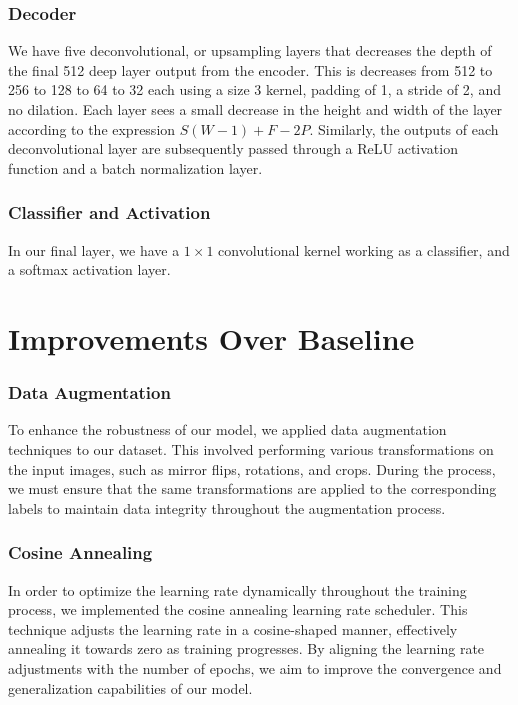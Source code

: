 \subsubsection*{Decoder}
We have five deconvolutional, or upsampling layers that decreases the depth of the final 512 deep layer output from the encoder. This is decreases from 512 to 256 to 128 to 64 to 32 each using a size 3 kernel, padding of 1, a stride of 2, and no dilation. Each layer sees a small decrease in the height and width of the layer according to the expression $S(W - 1) + F - 2P$. Similarly, the outputs of each deconvolutional layer are subsequently passed through a ReLU activation function and a batch normalization layer.

\subsubsection*{Classifier and Activation}
In our final layer, we have a $1 \times 1$ convolutional kernel working as a classifier, and a softmax activation layer.

\section*{Improvements Over Baseline}

\subsubsection*{Data Augmentation}
To enhance the robustness of our model, we applied data augmentation techniques to our dataset. This involved performing various transformations on the input images, such as mirror flips, rotations, and crops. During the process, we must ensure that the same transformations are applied to the corresponding labels to maintain data integrity throughout the augmentation process.

\subsubsection*{Cosine Annealing}
In order to optimize the learning rate dynamically throughout the training process, we implemented the cosine annealing learning rate scheduler. This technique adjusts the learning rate in a cosine-shaped manner, effectively annealing it towards zero as training progresses. By aligning the learning rate adjustments with the number of epochs, we aim to improve the convergence and generalization capabilities of our model.

